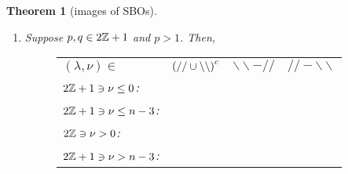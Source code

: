 \documentclass[12pt]{article} %
\newtheorem{theorem}{Theorem}
\theoremstyle{definition}
\theoremstyle{exampstyle} \newtheorem{examp}[theorem]{Theorem}
\newcommand{\even}{2\Z}
\newcommand{\odd}{2\Z+1}
\newcommand{\bb}{\backslash\backslash}
\renewcommand{\ss}{//}
\begin{document}
\begin{theorem}[images of SBOs]
\begin{enumerate}
\begin{figure}[H]
\begin{tabular}{m{3.5cm}ccc}
	      $(\lambda,\nu)\in$&$\left(//\cup\backslash\backslash\right)^c$ & $//-\backslash\backslash$  & $//\cap\backslash\backslash,k< l$\\[15pt]
	      \vspace{-3cm}$\even\ni\nu\ge n-1$:&\\[25pt]
	      \vspace{-3cm}$\odd\ni\nu\ge\frac{n+1}{2}$:&\\[25pt]
	    \end{tabular}
	  \end{figure}
	\item Suppose $p,q\in\odd$ and $p>1$. Then,
		\begin{figure}[H]
			\hskip-3.6cm\noindent\begin{tabular}{m{3.5cm}ccc}
			$(\lambda,\nu)\in$&$\mybra{\ss\cup\bb}^c$ & $\bb-\ss$  & $\ss-\bb$\\[15pt]
			\vspace{-3cm}$\odd\ni\nu\le0$:&\\[15pt]
			\vspace{-3cm}$\odd\ni\nu\le n-3$:&\\[15pt]
			\vspace{-3cm}$\even\ni\nu>0$:&\\[15pt]
			\vspace{-3cm}$\odd\ni\nu>n-3$:&\\[15pt]
			  

\end{tabular}
\end{figure}
\end{enumerate}
\end{theorem}
\end{document}
